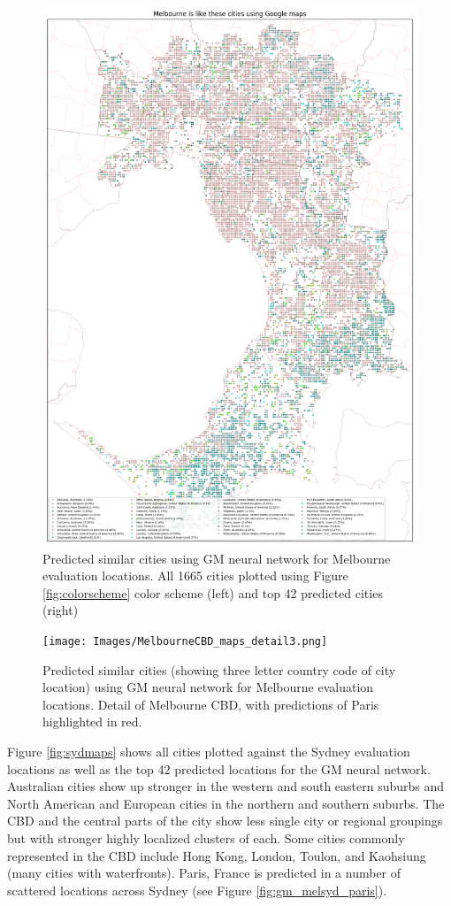 \documentclass[sageh,times]{sagej}
\begin{document}
\begin{figure}[!htbp]
\includegraphics[scale=0.20]{Images/MelbourneOverallAbrev_maps.png} 
\caption{Predicted similar cities using GM neural network for Melbourne evaluation locations. All 1665 cities plotted using Figure \ref{fig:colorscheme} color scheme (left) and top 42 predicted cities (right)}    
 \label{fig:melmaps}  
\end{figure} 

\begin{figure}[!htbp]
\centering     
\texttt{[image: Images/MelbourneCBD\_maps\_detail3.png]} 
\caption{Predicted similar cities (showing three letter country code of city location) using GM neural network for Melbourne evaluation locations. Detail of Melbourne CBD, with predictions of Paris highlighted in red.}    
 \label{fig:melmapscbd}  
\end{figure} 

Figure \ref{fig:sydmaps} shows all cities plotted against the Sydney evaluation locations as well as the top 42 predicted locations for the GM neural network. Australian cities show up stronger in the western and south eastern suburbs and North American and European cities in the northern and southern suburbs. The CBD and the central parts of the city show less single city or regional groupings but with stronger highly localized clusters of each. Some cities commonly represented in the CBD include Hong Kong, London, Toulon, and Kaohsiung (many cities with waterfronts). Paris, France is predicted in a number of scattered locations across Sydney (see Figure \ref{fig:gm_melsyd_paris}).
\end{document}
